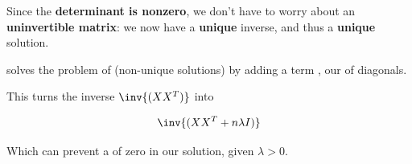         Since the \textbf{determinant is nonzero}, we don't have to worry about an \textbf{uninvertible matrix}: we now have a \textbf{unique} inverse, and thus a \textbf{unique} solution.\\
        
        \begin{concept}
             solves the problem of  (non-unique solutions) by adding a term , our  of diagonals.
            
            This turns the inverse $\inv{(XX^T)}$ into 
            
            \begin{equation*}
                \inv{(XX^T + n \lambda I)}
            \end{equation*}
            
            Which can prevent a  of zero in our solution, given $\lambda>0$.
        \end{concept}
        
        
        
    
\pagebreak
      